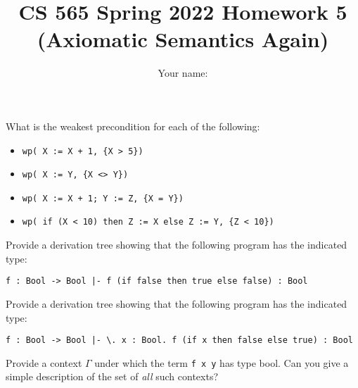 \documentclass[12pt]{article}
\newenvironment{problem}[2][Problem]{\begin{trivlist}
\item[\hskip \labelsep {\bfseries #1}\hskip \labelsep {\bfseries #2.}]}{\end{trivlist}}
\begin{document}
\title{CS 565 Spring 2022 Homework 5 \\ (Axiomatic Semantics Again)}
\author{Your name: \underline{\hspace{10cm}}}
\maketitle

\begin{problem}{1 (2 points)}
What is the weakest precondition for each of the following:

\begin{itemize}
\item[a. ]   \lstinline!wp( X := X + 1, {X > 5})!
  \vspace{3cm}

\item[b. ]    \lstinline!wp( X := Y, {X <> Y})!
\vspace{3cm}

\item[c. ]   \lstinline!wp( X := X + 1; Y := Z, {X = Y})!
\vspace{3cm}

\item[d. ]   \lstinline!wp( if (X < 10) then Z := X else Z := Y, {Z < 10})!
  \vspace{3cm}

\end{itemize}
\end{problem}

\pagebreak

\begin{problem}{2 (1 point)}
  Provide a derivation tree showing that the following program has the
  indicated type:
  \vspace{6cm}
  \begin{center}
    \lstinline!f : Bool -> Bool |- f (if false then true else false) : Bool !
  \end{center}
\end{problem}

\begin{problem}{3 (1 point)}
  Provide a derivation tree showing that the following program has the
  indicated type:
  \vspace{6cm}
  \begin{center}
    \lstinline!f : Bool -> Bool |- \. x : Bool. f (if x then false else true) : Bool !
  \end{center}
\end{problem}

\begin{problem}{4 (1 point)}
  Provide a context $\Gamma$ under which the term \lstinline!f x y!
  has type bool. Can you give a simple description of the set of
  \emph{all} such contexts?
\end{problem}
\end{document}
